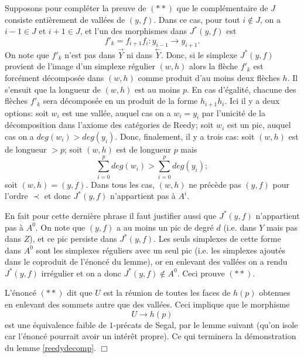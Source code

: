 \documentclass[12pt]{article}
\newcommand{\eop}{\hfill $\Box$\vspace{.1in}}
\newcommand{\direct}[1]{\stackrel{\rightarrow}{#1}}
\newcommand{\inverse}[1]{\stackrel{\leftarrow}{#1}}
\begin{document}
Supposons pour compl\'eter la preuve de $(\ast \ast )$ que le compl\'ementaire
de $J$ consiste enti\`erement de vall\'ees de $(y,f)$. Dans ce cas, pour tout
$i\not \in J$, on a $i-1\in J$ et $i+1\in J$, et l'un des morphismes dans
$J^{\ast}(y,f)$ est
$$
f'_k=f_{i+1}f_i: y_{i-1}\rightarrow y_{i+1}.
$$
On note que $f'_k$ n'est pas dans $\direct{Y}$ ni dans $\inverse{Y}$.
Donc, si le simplexe $J^{\ast}(y,f)$ provient de l'image d'un simplexe
r\'egulier
$(w,h)$ alors la fl\`eche $f'_k$ est forc\'ement d\'ecompos\'ee dans $(w,h)$
comme produit d'au moins deux fl\`eches $h$. Il s'ensuit que la longueur de
$(w,h)$
est au moins $p$. En cas d'\'egalit\'e, chacune des fl\`eches $f'_k$ sera
d\'ecompos\'ee en un produit de la forme $h_{i+1} h_i$. Ici il y a deux
options: soit $w_i$ est une vall\'ee, auquel cas on a $w_i=y_i$ par
l'unicit\'e de
la d\'ecomposition dans l'axiome des cat\'egories de Reedy; soit $w_i$ est
un pic, auquel cas on a $deg (w_i)> deg(y_i)$. Donc, finalement, il y a
trois cas:
soit $(w,h)$ est de longueur $>p$; soit $(w,h)$ est de longueur $p$ mais
$$
\sum _{i=0}^p deg(w_i)>  \sum _{i=0}^p deg(y_i);
$$
soit $(w,h)=(y,f)$. Dans tous les cas, $(w,h)$ ne pr\'ec\`ede pas $(y,f)$ pour
l'ordre $\prec$ et donc $J^{\ast}(y,f)$ n'appartient pas \`a $A^i$.

En fait pour cette derni\`ere phrase il faut justifier aussi que
$J^{\ast}(y,f)$ n'appartient pas \`a $A^0$. On note que $(y,f)$ a
au moins un pic de degr\'e $d$ (i.e. dans $Y$ mais pas dans $Z$), et ce pic
persiste dans
$J^{\ast}(y,f)$. Les seuls simplexes de cette forme dans $A^0$ sont
les simplexes r\'eguliers avec un seul pic (i.e. les simplexes ajout\'es dans
le coproduit de l'\'enonc\'e du lemme), or en enlevant des vall\'ees on a rendu
$J^{\ast}(y,f)$ irr\'egulier et on a donc $J^{\ast}(y,f)\not \in A^0$.
Ceci
prouve $(\ast \ast )$.

L'\'enonc\'e $(\ast \ast )$ dit que $U$ est la r\'eunion de toutes les
faces de $h(p)$ obtenues en enlevant des sommets autre que des vall\'ees.
Ceci implique
que le morphisme
$$
U\rightarrow
h(p)
$$
est une \'equivalence faible de $1$-pr\'ecats de Segal, par le lemme suivant
(qu'on isole car l'\'enonc\'e pourrait avoir un int\'er\^et propre). Ce qui
terminera la
d\'emonstration du
lemme \ref{reedydecomp}.
\eop
\end{document}
